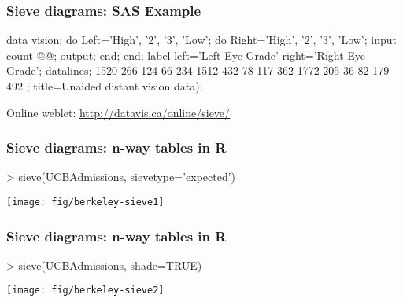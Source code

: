 \begin{frame}[fragile]
  \frametitle{Sieve diagrams: SAS Example}
\begin{Input}[fontsize=\small,label=\fbox{\texttt{sievem.sas}},baselinestretch=0.8]
data vision;
  do Left='High', '2', '3', 'Low';
  	do Right='High', '2', '3', 'Low';
        input count @@; output;
        end;
    end;
  label left='Left Eye Grade'  right='Right Eye Grade';
datalines;
       1520   266   124    66
        234  1512   432    78
        117   362  1772   205
         36    82   179   492 
;
    title=Unaided distant vision data);
\end{Input} 
Online weblet: \url{http://datavis.ca/online/sieve/}
\end{frame}

\begin{frame}[fragile]
  \frametitle{Sieve diagrams: n-way tables in R}
\begin{Rin}
> sieve(UCBAdmissions, sievetype='expected')
\end{Rin}
	  \begin{center}
	  \texttt{[image: fig/berkeley-sieve1]}
	  \end{center}

\end{frame}

\begin{frame}[fragile]
  \frametitle{Sieve diagrams: n-way tables in R}
\begin{Rin}
> sieve(UCBAdmissions, shade=TRUE)
\end{Rin}
	  \begin{center}
	  \texttt{[image: fig/berkeley-sieve2]}
	  \end{center}

\end{frame}
